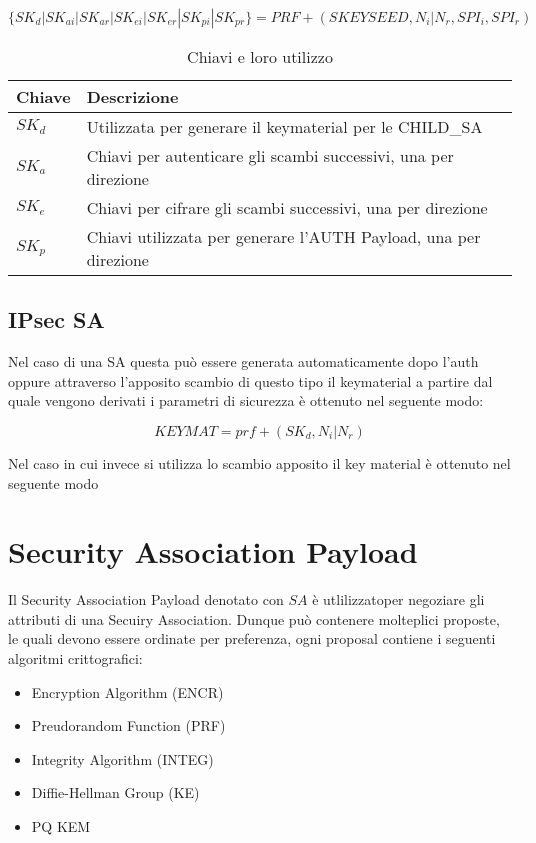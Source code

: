 $$\{SK_{d} | SK_{ai} | SK_{ar} | SK_{ei} | SK_{er} | SK_{pi} | SK_{pr} \} = PRF+(SKEYSEED, N_i|N_r, SPI_i, SPI_r)$$

\begin{table}[htbp]
    \centering
    \begin{tabular}{ll}
        \toprule
        \textbf{Chiave} & \textbf{Descrizione} \\
        \midrule
        $SK_d$ & Utilizzata per generare il keymaterial per le CHILD\_SA \\
        $SK_{a}$ & Chiavi per autenticare gli scambi successivi, una per direzione \\
        $SK_{e}$ & Chiavi per cifrare gli scambi successivi, una per direzione \\
        $SK_{p}$ & Chiavi utilizzata per generare l'AUTH Payload, una per direzione \\
        \bottomrule
    \end{tabular}
    \caption{Chiavi e loro utilizzo}
\end{table}

\subsection{IPsec SA}

Nel caso di una SA questa può essere generata automaticamente dopo l'auth oppure attraverso l'apposito scambio di questo tipo il keymaterial a partire dal quale vengono derivati i parametri di sicurezza è ottenuto nel seguente modo:

$$KEYMAT=prf+(SK_d,  N_i|N_r)$$

Nel caso in cui invece si utilizza lo scambio apposito il key material è ottenuto nel seguente modo


\section{Security Association Payload}

Il Security Association Payload denotato con $SA$ è utlilizzatoper negoziare gli attributi di una Secuiry Association. 
Dunque può contenere molteplici proposte, le quali devono essere ordinate per preferenza, ogni proposal contiene i seguenti algoritmi crittografici:

\begin{itemize}
    \item Encryption Algorithm (ENCR)
    \item Preudorandom Function (PRF)
    \item Integrity Algorithm (INTEG)
    \item Diffie-Hellman Group (KE)
    \item PQ KEM 
\end{itemize}
